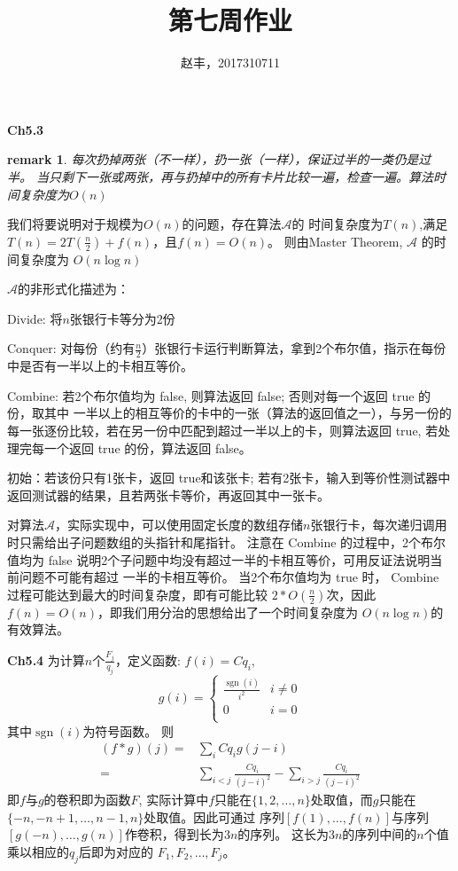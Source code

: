 \documentclass{article}
\newtheorem{remark}{remark}
\DeclareMathOperator{\sgn}{sgn}
\begin{document}
\title{第七周作业}
\author{赵丰，2017310711}
\maketitle

\textbf{Ch5.3}

\begin{remark}
每次扔掉两张（不一样），扔一张（一样），保证过半的一类仍是过半。
当只剩下一张或两张，再与扔掉中的所有卡片比较一遍，检查一遍。算法时间复杂度为$O(n)$
\end{remark}

我们将要说明对于规模为$O(n)$的问题，存在算法$\mathcal{A}$的
时间复杂度为$T(n)$,满足$T(n)=2T(\frac{n}{2})+f(n)$，且$f(n)=O(n)$。
则由Master Theorem, $\mathcal{A}$ 的时间复杂度为 $O(n\log n)$

$\mathcal{A}$的非形式化描述为：

Divide: 将$n$张银行卡等分为2份

Conquer: 对每份（约有$\frac{n}{2}$）张银行卡运行判断算法，拿到2个布尔值，指示在每份中是否有一半以上的卡相互等价。

Combine: 若2个布尔值均为 false, 则算法返回 false; 否则对每一个返回 true 的份，取其中
一半以上的相互等价的卡中的一张（算法的返回值之一），与另一份的每一张逐份比较，若在另一份中匹配到超过一半以上的卡，则算法返回 true,
若处理完每一个返回 true 的份，算法返回 false。

初始：若该份只有1张卡，返回 true和该张卡; 若有2张卡，输入到等价性测试器中返回测试器的结果，且若两张卡等价，再返回其中一张卡。

对算法$\mathcal{A}$，实际实现中，可以使用固定长度的数组存储$n$张银行卡，每次递归调用时只需给出子问题数组的头指针和尾指针。
注意在 Combine 的过程中，2个布尔值均为 false 说明2个子问题中均没有超过一半的卡相互等价，可用反证法说明当前问题不可能有超过
一半的卡相互等价。 当2个布尔值均为 true 时， Combine 过程可能达到最大的时间复杂度，即有可能比较 $2*O(\frac{n}{2})$次，因此
$f(n)=O(n)$，即我们用分治的思想给出了一个时间复杂度为 $O(n\log n)$的有效算法。

\textbf{Ch5.4}
为计算$n$个$\frac{F_j}{q_j}$，定义函数:
$f(i)=C q_i$,
\begin{equation}
g(i)=\begin{cases}
\frac{\sgn(i)}{i^2} & i\neq 0\\
0 & i=0 \\
\end{cases}
\end{equation}
其中$\sgn(i)$为符号函数。
则
\begin{align}
(f * g)(j)= &\sum_{i} Cq_i g(j-i)\\
= &\sum_{i<j} \frac{C q_i}{(j-i)^2}-\sum_{i>j}\frac{C q_i}{(j-i)^2}
\end{align}
即$f$与$g$的卷积即为函数$F$,
实际计算中$f$只能在$\{1,2,\dots,n\}$处取值，而$g$只能在$\{-n,-n+1,\dots,n-1,n\}$处取值。因此可通过
序列$[f(1),\dots,f(n)]$与序列$[g(-n),\dots,g(n)]$作卷积，得到长为$3n$的序列。
这长为$3n$的序列中间的$n$个值乘以相应的$q_j$后即为对应的
$F_1,F_2,\dots,F_j$。
\end{document}
